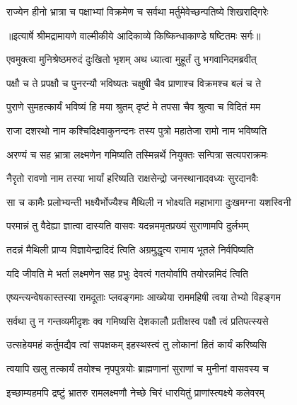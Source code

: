 \twolineshloka
{राज्येन हीनो भ्रात्रा च पक्षाभ्यां विक्रमेण च}
{सर्वथा मर्तुमेवेच्छन्पतिष्ये शिखराद्गिरेः} %


{॥इत्यार्षे श्रीमद्रामायणे वाल्मीकीये आदिकाव्ये किष्किन्धाकाण्डे षष्टितमः सर्गः॥}


\twolineshloka
{एवमुक्त्वा मुनिश्रेष्ठमरुदं दुःखितो भृशम्}
{अथ ध्यात्वा मुहूर्तं तु भगवानिदमब्रवीत्} %

\twolineshloka
{पक्षौ च ते प्रपक्षौ च पुनरन्यौ भविष्यतः}
{चक्षुषी चैव प्राणाश्च विक्रमश्च बलं च ते} %

\twolineshloka
{पुराणे सुमहत्कार्यं भविष्यं हि मया श्रुतम्}
{दृष्टं मे तपसा चैव श्रुत्वा च विदितं मम} %

\twolineshloka
{राजा दशरथो नाम कश्चिदिक्ष्वाकुनन्दनः}
{तस्य पुत्रो महातेजा रामो नाम भविष्यति} %

\twolineshloka
{अरण्यं च सह भ्रात्रा लक्ष्मणेन गमिष्यति}
{तस्मिन्नर्थे नियुक्तः सन्पित्रा सत्यपराक्रमः} %

\twolineshloka
{नैरृतो रावणो नाम तस्या भार्यां हरिष्यति}
{राक्षसेन्द्रो जनस्थानादवध्यः सुरदानवैः} %

\twolineshloka
{सा च कामैः प्रलोभ्यन्ती भक्ष्यैर्भोज्यैश्च मैथिली}
{न भोक्ष्यति महाभागा दुःखमग्ना यशस्विनी} %

\twolineshloka
{परमान्नं तु वैदेह्या ज्ञात्वा दास्यति वासवः}
{यदन्नममृतप्रख्यं सुराणामपि दुर्लभम्} %

\twolineshloka
{तदन्नं मैथिली प्राप्य विज्ञायेन्द्रादिदं त्विति}
{अग्रमुद्धृत्य रामाय भूतले निर्वपिष्यति} %

\twolineshloka
{यदि जीवति मे भर्ता लक्ष्मणेन सह प्रभुः}
{देवत्वं गतयोर्वापि तयोरन्नमिदं त्विति} %

\twolineshloka
{एष्यन्त्यन्वेषकास्तस्या रामदूताः प्लवङ्गमाः}
{आख्येया राममहिषी त्वया तेभ्यो विहङ्गम} %

\twolineshloka
{सर्वथा तु न गन्तव्यमीदृशः क्व गमिष्यसि}
{देशकालौ प्रतीक्षस्व पक्षौ त्वं प्रतिपत्स्यसे} %

\twolineshloka
{उत्सहेयमहं कर्तुमद्यैव त्वां सपक्षकम्}
{इहस्थस्त्वं तु लोकानां हितं कार्यं करिष्यसि} %

\twolineshloka
{त्वयापि खलु तत्कार्यं तयोश्च नृपपुत्रयोः}
{ब्राह्मणानां सुराणां च मुनीनां वासवस्य च} %

\twolineshloka
{इच्छाम्यहमपि द्रष्टुं भ्रातरु रामलक्ष्मणौ}
{नेच्छे चिरं धारयितुं प्राणांस्त्यक्ष्ये कलेवरम्} %


